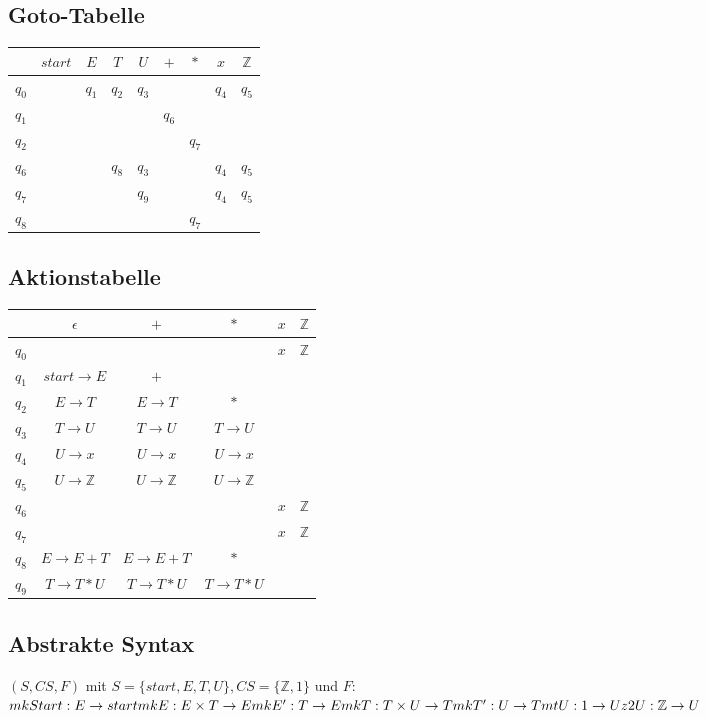 \subsection*{Goto-Tabelle}
\begin{tabular}{c|cccccccc}
&$start$&$E$&$T$&$U$&$+$&$*$&$x$&$\mathbb{Z}$\\
\hline
$q_0$&&$q_1$&$q_2$&$q_3$&&&$q_4$&$q_5$\\
$q_1$&&&&&$q_6$&&&\\
$q_2$&&&&&&$q_7$&&\\
$q_6$&&&$q_8$&$q_3$&&&$q_4$&$q_5$\\
$q_7$&&&&$q_9$&&&$q_4$&$q_5$\\
$q_8$&&&&&&$q_7$&&\\
\end{tabular}
\subsection*{Aktionstabelle}
\begin{tabular}{c|ccccc}
&$\epsilon$&$+$&$*$&$x$&$\mathbb{Z}$\\
\hline
$q_0$&&&&$x$&$\mathbb{Z}$\\
$q_1$&$start\rightarrow E$&$+$&&&\\
$q_2$&$E\rightarrow T$&$E\rightarrow T$&$*$&&\\
$q_3$&$T\rightarrow U$&$T\rightarrow U$&$T\rightarrow U$&\\
$q_4$&$U\rightarrow x$&$U\rightarrow x$&$U\rightarrow x$\\
$q_5$&$U\rightarrow \mathbb{Z}$&$U\rightarrow \mathbb{Z}$&$U\rightarrow \mathbb{Z}$\\
$q_6$&&&&$x$&$\mathbb{Z}$\\
$q_7$&&&&$x$&$\mathbb{Z}$\\
$q_8$&$E\rightarrow E+T$&$E\rightarrow E+T$&$*$\\
$q_9$&$T\rightarrow T*U$&$T\rightarrow T*U$&$T\rightarrow T*U$\\
\end{tabular}
\subsection*{Abstrakte Syntax}
$(S,CS,F)$ mit $S=\{start,E,T,U\}, CS=\{\mathbb{Z}, 1\}$ und $F:$\\
$mkStart: E \rightarrow start\\
mkE:E\times T\rightarrow E\\
mkE':T\rightarrow E\\
mkT:T\times U \rightarrow T\\
mkT': U\rightarrow T\\
mtU: 1\rightarrow U\\
z2U: \mathbb{Z}\rightarrow U$
